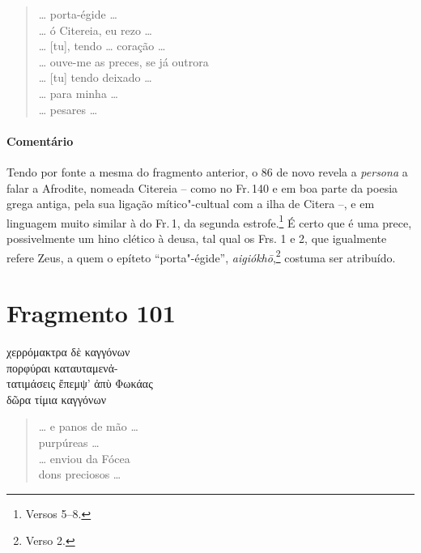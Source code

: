 \begin{verse}
\ldots{} porta-égide \ldots{}\\
\ldots{} ó Citereia, eu rezo \ldots{}\\
\ldots{} [tu], tendo \ldots{} coração \ldots{}\\
\ldots{} ouve-me as preces, se já outrora\\
\ldots{} [tu] tendo deixado \ldots{}\\
\ldots{} para minha \ldots{}\\
\ldots{} pesares \ldots{}
\end{verse}

\medskip

{\paragraph{Comentário} Tendo por fonte a mesma do fragmento anterior, o 86 de novo revela a \textit{persona} a falar a Afrodite, nomeada Citereia -- como no Fr.\,140 e em boa parte da poesia grega antiga, pela sua ligação mítico"-cultual com a ilha de Citera --, e em linguagem muito similar à do Fr.\,1, da segunda estrofe.\footnote{Versos 5--8.} É certo que é uma prece, possivelmente um hino clético à deusa, tal qual os Frs. 1 e 2, que igualmente refere Zeus, a quem o epíteto ``porta"-égide'', \textit{aigiókhō},\footnote{Verso 2.} costuma ser atribuído.}

\pagebreak

\section{Fragmento 101}

\begin{gkverse}
χερρόμακτρα δὲ \dagger{}καγγόνων\dagger{}\\
πορφύραι \dagger{}καταυταμενἀ-\\
τατιμάσεις\dagger{} ἔπεμψ’ ἀπὺ Φωκάας\\
δῶρα τίμια \dagger{}καγγόνων\dagger{}\\
\end{gkverse}

\begin{verse}
\ldots{} e panos de mão \ldots{}\\
purpúreas \ldots{}\\
\ldots{} enviou da Fócea\\
dons preciosos \ldots{}
\end{verse}

\medskip

